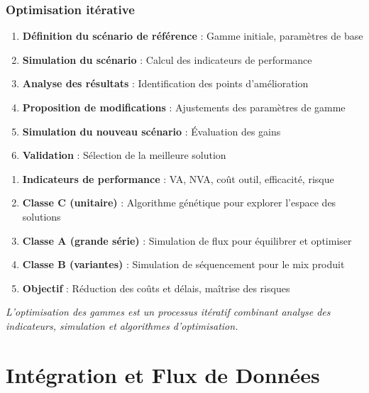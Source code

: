 \documentclass{article}
\begin{document}
\begin{table}[h]
\subsubsection{Optimisation itérative}

\begin{enumerate}
    \item \textbf{Définition du scénario de référence} : Gamme initiale, paramètres de base
    \item \textbf{Simulation du scénario} : Calcul des indicateurs de performance
    \item \textbf{Analyse des résultats} : Identification des points d'amélioration
    \item \textbf{Proposition de modifications} : Ajustements des paramètres de gamme
    \item \textbf{Simulation du nouveau scénario} : Évaluation des gains
    \item \textbf{Validation} : Sélection de la meilleure solution
\end{enumerate}

\begin{tcolorbox}[colback=blueclair, colframe=blue!70!black, title=Synthèse : Optimisation des Gammes]
\begin{enumerate}
    \item \textbf{Indicateurs de performance} : VA, NVA, coût outil, efficacité, risque
    \item \textbf{Classe C (unitaire)} : Algorithme génétique pour explorer l'espace des solutions
    \item \textbf{Classe A (grande série)} : Simulation de flux pour équilibrer et optimiser
    \item \textbf{Classe B (variantes)} : Simulation de séquencement pour le mix produit
    \item \textbf{Objectif} : Réduction des coûts et délais, maîtrise des risques
\end{enumerate}
\vspace{0.5em}
\textit{L'optimisation des gammes est un processus itératif combinant analyse des indicateurs, simulation et algorithmes d'optimisation.}
\end{tcolorbox}

\section{Intégration et Flux de Données}


\end{table}
\end{document}
